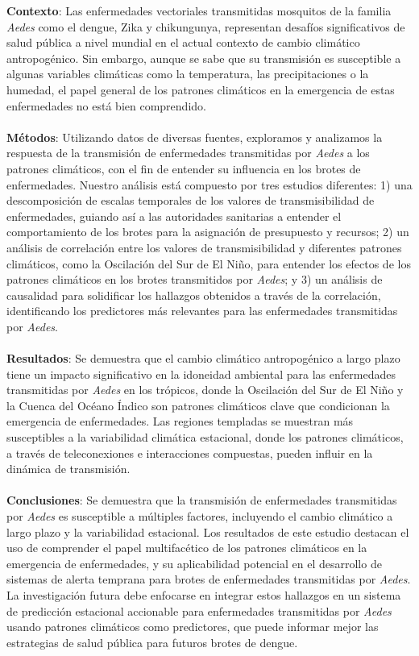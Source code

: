 \documentclass[10pt]{article}
\begin{document}
\textbf{Contexto}: Las enfermedades vectoriales transmitidas mosquitos de la familia \textit{Aedes} como el dengue, Zika y chikungunya, representan desafíos significativos de salud pública a nivel mundial en el actual contexto de cambio climático antropogénico. Sin embargo, aunque se sabe que su transmisión es susceptible a algunas variables climáticas como la temperatura, las precipitaciones o la humedad, el papel general de los patrones climáticos en la emergencia de estas enfermedades no está bien comprendido.
\\
\\
\textbf{Métodos}: Utilizando datos de diversas fuentes, exploramos y analizamos la respuesta de la transmisión de enfermedades transmitidas por \textit{Aedes} a los patrones climáticos, con el fin de entender su influencia en los brotes de enfermedades. Nuestro análisis está compuesto por tres estudios diferentes: 1) una descomposición de escalas temporales de los valores de transmisibilidad de enfermedades, guiando así a las autoridades sanitarias a entender el comportamiento de los brotes para la asignación de presupuesto y recursos; 2) un análisis de correlación entre los valores de transmisibilidad y diferentes patrones climáticos, como la Oscilación del Sur de El Niño, para entender los efectos de los patrones climáticos en los brotes transmitidos por \textit{Aedes}; y 3) un análisis de causalidad para solidificar los hallazgos obtenidos a través de la correlación, identificando los predictores más relevantes para las enfermedades transmitidas por \textit{Aedes}.
\\
\\
\textbf{Resultados}: Se demuestra que el cambio climático antropogénico a largo plazo tiene un impacto significativo en la idoneidad ambiental para las enfermedades transmitidas por \textit{Aedes} en los trópicos, donde la Oscilación del Sur de El Niño y la Cuenca del Océano Índico son patrones climáticos clave que condicionan la emergencia de enfermedades. Las regiones templadas se muestran más susceptibles a la variabilidad climática estacional, donde los patrones climáticos, a través de teleconexiones e interacciones compuestas, pueden influir en la dinámica de transmisión.
\\
\\
\textbf{Conclusiones}: Se demuestra que la transmisión de enfermedades transmitidas por \textit{Aedes} es susceptible a múltiples factores, incluyendo el cambio climático a largo plazo y la variabilidad estacional. Los resultados de este estudio destacan el uso de comprender el papel multifacético de los patrones climáticos en la emergencia de enfermedades, y su aplicabilidad potencial en el desarrollo de sistemas de alerta temprana para brotes de enfermedades transmitidas por \textit{Aedes}. La investigación futura debe enfocarse en integrar estos hallazgos en un sistema de predicción estacional accionable para enfermedades transmitidas por \textit{Aedes} usando patrones climáticos como predictores, que puede informar mejor las estrategias de salud pública para futuros brotes de dengue.
\end{document}
